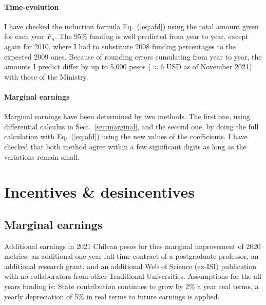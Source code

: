 \documentclass[twocolumn]{article}
\def\eqref#1{Eq.~(\ref{eq:#1})}
\begin{document}
\paragraph{Time-evolution} I have checked the induction formula \eqref{afd} using the total amount given for each year $F_n$.  The 95\% funding is well predicted from year to year, except again for 2010, where I had to substitute 2008 funding percentages to the expected 2009 ones. Because of rounding errors cumulating from year to year, the amounts I predict differ by up to 5,000 pesos ($\approx 6$ USD as of November 2021) with those of the Ministry.

\paragraph{Marginal earnings}  Marginal earnings have been determined by two methods.  The first one, using differential calculus in Sect.~\ref{sec:marginal}, and the second one, by doing the full calculation with \eqref{afd} using the new values of the coefficients.  I have checked that both method agree within a few significant digits as long as the variations remain small.

\section{Incentives \& desincentives}
\subsection{Marginal earnings}
\label{tab:sciencecost}
\begin{table}[t]
\centering
\caption{Additional earnings in 2021 Chilean pesos for thes marginal improvement of 2020 metrics: an additional one-year full-time contract of a postgraduate professor, an additional research grant, and an additional Web of Science (ex-ISI) publication with no collaborators from other Traditional Universities.  Assumptions for the all years funding is: State contribution continues to grow by 2\% a year real terms, a yearly depreciation of 5\% in real terms to future earnings is applied.}
\setlength\tabcolsep{5pt}
\vskip 5pt

\end{table}
\end{document}
